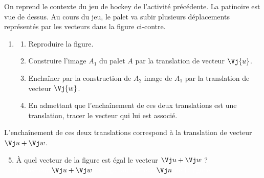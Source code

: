 \documentclass[a4paper,11pt,french]{report}
\begin{document}
\begin{ActiviteBox}

On reprend le contexte du jeu de hockey de l'activité précédente. La patinoire est vue de dessus. Au cours du jeu, le palet va subir plusieurs déplacements représentés par les vecteurs dans la figure ci-contre.

\begin{enumerate}
\item
\begin{enumerate}
\item Reproduire la figure.
\item Construire l'image $A_1$ du palet $A$ par la translation de vecteur $\Vj{u}$.
\item Enchaîner par la construction de $A_2$ image de $A_1$ par la translation de vecteur $\Vj{w}$.
\item En admettant que l'enchaînement de ces deux translations est une translation, tracer le vecteur qui lui est associé.
\end{enumerate}
\end{enumerate}

\begin{center}
\end{center}

\begin{JauneBox}
L'enchaînement de ces deux translations correspond à la translation de vecteur $\Vj u+\Vj w$.
\end{JauneBox}

\begin{enumerate}
\setcounter{enumi}{4}
\item[e)] À quel vecteur de la figure est égal le vecteur $\Vj u+\Vj w$ ?\\
\textcolor{white}{Le vecteur $\Vj u+\Vj w$ est égal au vecteur $\Vj n$ de la figure.}
\end{enumerate}


\end{ActiviteBox}
\end{document}
